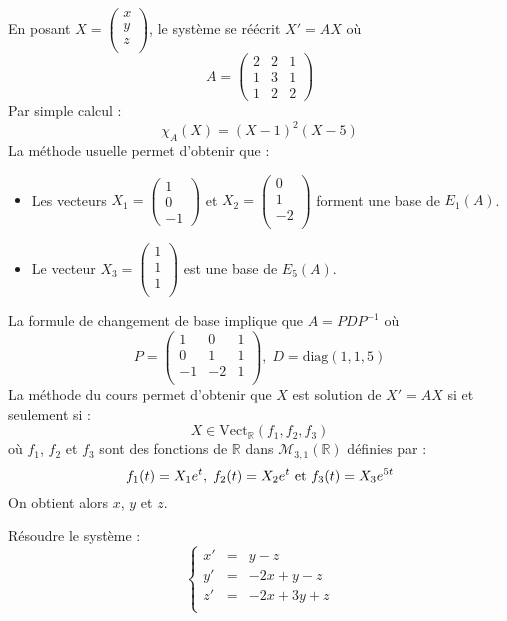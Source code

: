 \documentclass[a4paper,10pt]{report}
\begin{document}
\corr En posant $X = \begin{pmatrix}
x \\
y \\
z \\
\end{pmatrix}$, le système se réécrit $X'=AX$ où 
$$A= \left(\begin{array}{rrr}  2 & 2 & 1\\
1 & 3 & 1\\
1 & 2 & 2 \end{array}\right)$$
Par simple calcul :
$$ \chi_A(X)= (X-1)^2 (X-5)$$
La méthode usuelle permet d'obtenir que :
\begin{itemize}
\item Les vecteurs $X_1=\begin{pmatrix}
1 \\
0 \\
-1
\end{pmatrix}$ et $X_2=\begin{pmatrix}
0\\
1 \\
-2 \\
\end{pmatrix}$ forment une base de $E_1(A)$.
\item Le vecteur $X_3=\begin{pmatrix}
1 \\
1 \\
1 \\
\end{pmatrix}$ est une base de $E_5(A)$.
\end{itemize}
La formule de changement de base implique que $A=PDP^{-1}$ où 
$$ P = \begin{pmatrix}
1& 0 & 1 \\
0& 1 & 1 \\
-1 & -2 & 1 \\
\end{pmatrix}, \; D= \textrm{diag}(1,1,5)$$
La méthode du cours permet d'obtenir que $X$ est solution de $X'=AX$ si et seulement si :
$$X \in \textrm{Vect}_{\mathbb{R}} (f_1,f_2,f_3)$$
où $f_1$, $f_2$ et $f_3$ sont des fonctions de $\mathbb{R}$ dans $\mathcal{M}_{3,1}(\mathbb{R})$ définies par :
$$ f_1(t)= X_1 e^{t}, \; f_2(t) = X_2 e^{t} \hbox{ et } f_3(t) =X_3 e^{5t} $$
On obtient alors $x$, $y$ et $z$.


\begin{Exercice}{} Résoudre le système :
$$ \left\lbrace \begin{array}{ccl}
x' & = & y-z \\
y' & = &-2x+y-z \\
z' & =& -2x+3y+z \\
\end{array}\right.$$
\end{Exercice}
\end{document}
